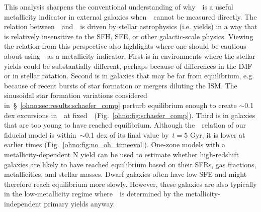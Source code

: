 \par
This analysis sharpens the conventional understanding of why~\no~is a useful
metallicity indicator in external galaxies when~\oh~cannot be measured directly.
The relation between~\no~and~\oh~is driven by stellar astrophysics (i.e. yields)
in a way that is relatively insensitive to the SFH, SFE, or other
galactic-scale physics.
Viewing the relation from this perspective also highlights where one should be
cautious about using~\no~as a metallicity indicator.
First is in environments where the stellar yields could be substantially
different, perhaps because of differences in the IMF or in stellar rotation.
Second is in galaxies that may be far from equilibrium, e.g. because of recent
bursts of star formation or mergers diluting the ISM.
The sinusoidal star formation variations considered
in~\S~\ref{ohno:sec:results:schaefer_comp} perturb equilibrium enough to create
$\sim$0.1 dex excursions in~\no~at fixed~\oh~(Fig.~\ref{ohno:fig:schaefer_comp}).
Third is in galaxies that are too young to have reached equilibrium.
Although the~\ohno~relation of our fiducial model is within~$\sim$0.1 dex of
its final value by~$t = 5$ Gyr, it is lower at earlier times
(Fig.~\ref{ohno:fig:no_oh_timeevol}).
One-zone models with a metallicity-dependent N yield can be used to estimate
whether high-redshift galaxies are likely to have reached equilibrium based
on their SFRs, gas fractions, metallicities, and stellar masses.
Dwarf galaxies often have low SFE and might therefore reach equilibrium more
slowly.
However, these galaxies are also typically in the low-metallicity regime
where~\no~is determined by the metallicity-independent primary yields anyway.

